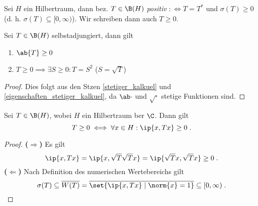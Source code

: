 	\begin{definition}
		Sei $H$ ein Hilbertraum, dann bez. \(T\in\B(H)\) \textit{positiv} \(:\iff T = T^*\) und \(\sigma(T) \geq 0\) (d. h. \(\sigma(T) \subseteq [0,\infty)\)). Wir schreiben dann auch \(T \geq 0\).
	\end{definition}
	
	\begin{theorem}
		Sei \(T\in\B(H)\) selbstadjungiert, dann gilt
		\begin{enumerate}
			\item \(\ab{T} \geq 0\)
			\item \(T\geq 0 \implies \exists S \geq 0: T = S^2\) ($S = \sqrt{T}$)
		\end{enumerate}
		\begin{proof}
			Dies folgt aus den S\as tzen \ref{stetiger_kalkuel} und \ref{eigenschaften_stetiger_kalkuel}, da \(\ab\cdot\) und \(\sqrt\cdot\) stetige Funktionen sind.
		\end{proof}
	\end{theorem}
	
	\begin{theorem}
		Sei \(T\in \B(H)\), wobei $H$ ein Hilbertraum \us ber $\C$. Dann gilt
		\[T \geq 0 \iff \forall x \in H: \ip{x,Tx} \geq 0 \;.\]
	\end{theorem}
	\begin{proof}
		\textbf{($\Longrightarrow$)} Es gilt
		\[\ip{x,Tx} = \ip{x,\sqrt{T}\sqrt{T} x} = \ip{\sqrt{T}x, \sqrt{T}x} \geq 0\;.\]
		\textbf{($\Longleftarrow$)}
		Nach Definition des numerischen Wertebereichs gilt
		\[\sigma(T) \subseteq \overline{W(T)} = \overline{\set{\ip{x, Tx}\;\vert\;\norm{x} = 1}} \subseteq [0,\infty)\;.\]
	\end{proof}